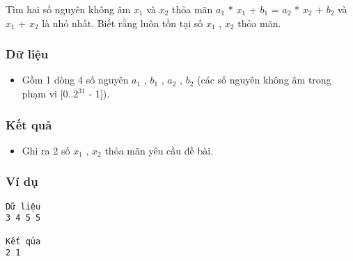 

Tìm hai số nguyên không âm $x_{1}$ và $x_{2}$ thỏa mãn $a_{1}$ * $x_{1}$ + $b_{1}$ = $a_{2}$ * $x_{2}$ + $b_{2}$ và $x_{1}$ + $x_{2}$ là nhỏ nhất. Biết rằng luôn tồn tại số $x_{1}$ , $x_{2}$ thỏa mãn.

\subsubsection{Dữ liệu}
\begin{itemize}
	\item Gồm 1 dòng 4 số nguyên $a_{1}$ , $b_{1}$ , $a_{2}$ , $b_{2}$ (các số nguyên không âm trong phạm vi [0..$2^{31}$ - 1]).
\end{itemize}

\subsubsection{Kết quả}
\begin{itemize}
	\item Ghi ra 2 số $x_{1}$ , $x_{2}$ thỏa mãn yêu cầu đề bài.
\end{itemize}

\subsubsection{Ví dụ}
\begin{verbatim}
Dữ liệu
3 4 5 5

Kết qủa
2 1
\end{verbatim}
